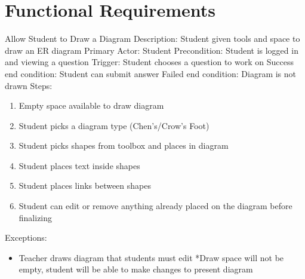     \chapter{Functional Requirements}
    \begin{section}{Allow Student to Draw a Diagram}
        Description: Student given tools and space to draw an ER diagram \newline
        Primary Actor: Student \newline
        Precondition: Student is logged in and viewing a            question \newline
        Trigger: Student chooses a question to work on \newline
        Success end condition: Student can submit answer            \newline
        Failed end condition: Diagram is not drawn \newline
        \newline
        Steps:
        \begin{enumerate}
            \item{Empty space available to draw diagram}
            \item{Student picks a diagram type (Chen's/Crow's Foot)}
            \item{Student picks shapes from toolbox and places in           diagram}
            \item{Student places text inside shapes}
            \item{Student places links between shapes}
            \item{Student can edit or remove anything already placed on the diagram before finalizing}
        \end{enumerate}
        Exceptions:
        \begin{itemize}
            \item{Teacher draws diagram that students must edit             \newline
                *Draw space will not be empty, student will be able to           make changes to present diagram}
        \end{itemize}
    \end{section}

